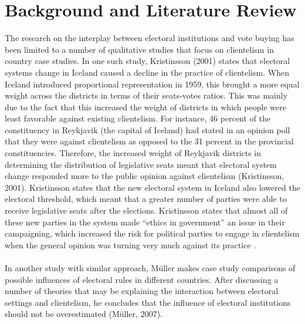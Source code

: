 \documentclass{article}
\begin{document}
\section{Background and Literature Review}
The research on the interplay between electoral institutions and vote buying has been limited to a number of qualitative studies that focus on clientelism in country case studies. In one such study, Kristinsson (2001) states that electoral systems change in Iceland caused a decline in the practice of clientelism. When Iceland introduced proportional representation in 1959, this brought a more equal weight across the districts in terms of their seats-votes ratios. This was mainly due to the fact that this increased the weight of districts in which people were least favorable against existing clientelism. For instance, 46 percent of the constituency in Reykjavik (the capital of Iceland) had stated in an opinion poll that they were against clientelism as opposed to the 31 percent in the provincial constituencies. Therefore, the increased weight of Reykjavik districts in determining the distribution of legislative seats meant that electoral system change responded more to the public opinion against clientelism (Kristinsson, 2001). Kristinsson states that the new electoral system in Iceland also lowered the electoral threshold, which meant that a greater number of parties were able to receive legislative seats after the elections. Kristinsson states that almost all of these new parties in the system made ``ethics in government'' an issue in their campaigning, which increased the risk for political parties to engage in clientelism when the general opinion was turning very much against its practice \cite{kristinsson2001clientelism}.\\
\\
In another study with similar approach, M\"uller makes case study comparisons of possible influences of electoral rules in different countries. After discussing a number of theories that may be explaining the interaction between electoral settings and clientelism, he concludes that the influence of electoral institutions should not be overestimated (M\"uller, 2007).\\
\\
\end{document}
